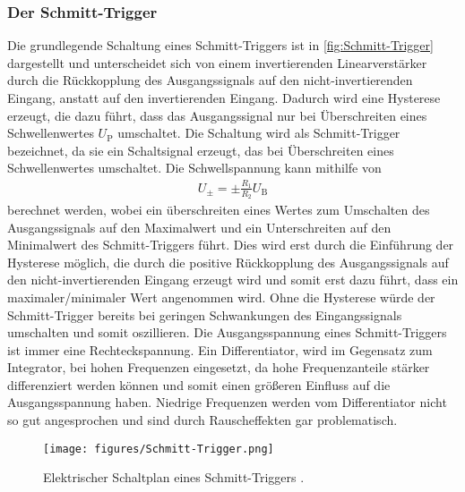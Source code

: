 \subsubsection{Der Schmitt-Trigger}\label{subsubsec:Schmitt-Trigger}    %
Die grundlegende Schaltung eines Schmitt-Triggers ist in \autoref{fig:Schmitt-Trigger} dargestellt und unterscheidet sich von einem invertierenden Linearverstärker durch die Rückkopplung des Ausgangssignals auf den nicht-invertierenden Eingang, anstatt auf den invertierenden Eingang.
Dadurch wird eine Hysterese erzeugt, die dazu führt, dass das Ausgangssignal nur bei Überschreiten eines Schwellenwertes $U_\text{P}$ umschaltet.
Die Schaltung wird als Schmitt-Trigger bezeichnet, da sie ein Schaltsignal erzeugt, das bei Überschreiten eines Schwellenwertes umschaltet.
Die Schwellspannung kann mithilfe von
\begin{align}
    U_\pm = \pm\frac{R_1}{R_2}U_\text{B}
\end{align}
berechnet werden, wobei ein überschreiten eines Wertes zum Umschalten des Ausgangssignals auf den Maximalwert und ein Unterschreiten auf den Minimalwert des Schmitt-Triggers führt.
Dies wird erst durch die Einführung der Hysterese möglich, die durch die positive Rückkopplung des Ausgangssignals auf den nicht-invertierenden Eingang erzeugt wird und somit erst dazu führt, dass ein maximaler/minimaler Wert angenommen wird.
Ohne die Hysterese würde der Schmitt-Trigger bereits bei geringen Schwankungen des Eingangssignals umschalten und somit oszillieren.
Die Ausgangsspannung eines Schmitt-Triggers ist immer eine Rechteckspannung.
Ein Differentiator, wird im Gegensatz zum Integrator, bei hohen Frequenzen eingesetzt, da hohe Frequenzanteile stärker differenziert werden können und somit einen größeren Einfluss auf die Ausgangsspannung haben.
Niedrige Frequenzen werden vom Differentiator nicht so gut angesprochen und sind durch Rauscheffekten gar problematisch.
\begin{figure}[H]
	\centering
    \texttt{[image: figures/Schmitt-Trigger.png]}
	\caption{Elektrischer Schaltplan eines Schmitt-Triggers \cite{Anleitung51}.}
	\label{fig:Schmitt-Trigger}
\end{figure}


